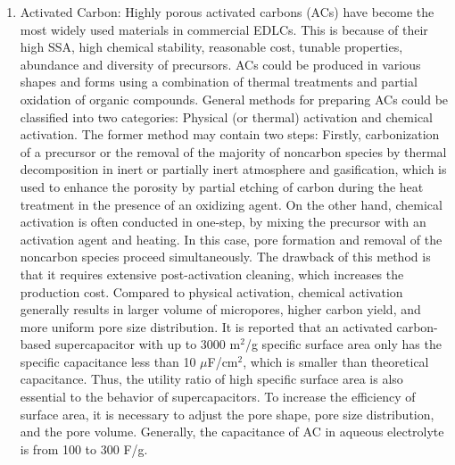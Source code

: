 \documentclass[reprint,amsmath,amssymb,aps,floatfix,
]{revtex4-2}
\begin{document}
\begin{enumerate}
    \item Activated Carbon: Highly porous activated carbons (ACs) have become the most widely used materials in commercial EDLCs. This is because of their high SSA, high chemical stability, reasonable cost, tunable properties, abundance and diversity of precursors. ACs could be produced in various shapes and forms using a combination of thermal treatments and partial oxidation of organic compounds. General methods for preparing ACs could be classified into two categories: Physical (or thermal) activation and chemical activation.\cite{Wigmans1989} The former method may contain two steps: Firstly, carbonization of a precursor or the removal of the majority of noncarbon species by thermal decomposition in inert or partially inert atmosphere and gasification, which is used to enhance the porosity by partial etching of carbon during the heat treatment in the presence of an oxidizing agent.\cite{Alar2007} On the other hand, chemical activation is often conducted in one-step, by mixing the precursor with an activation agent and heating. In this case, pore formation and removal of the noncarbon species proceed simultaneously. The drawback of this method is that it requires extensive post-activation cleaning, which increases the production cost. Compared to physical activation, chemical activation generally results in larger volume of micropores, higher carbon yield, and more uniform pore size distribution.\cite{Lillo2003} It is reported that an activated carbon-based supercapacitor with up to 3000 m$^2$/g specific surface area only has the specific capacitance less than 10 $\mu$F/cm$^2$, which is smaller than theoretical capacitance. Thus, the utility ratio of high specific surface area is also essential to the behavior of supercapacitors.\cite{Kierzek2004} To increase the efficiency of surface area, it is necessary to adjust the pore shape, pore size distribution, and the pore volume. Generally, the capacitance of AC in aqueous electrolyte is from 100 to 300 F/g.\cite{Mingjia2014}

\end{enumerate}
\end{document}
